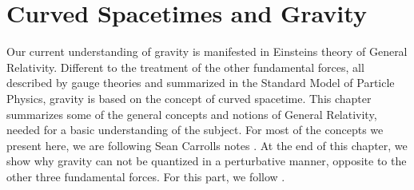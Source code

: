 \chapter{Curved Spacetimes and Gravity}\label{chap:GR}
Our current understanding of gravity is manifested in Einsteins theory of General Relativity. Different to the treatment of the other fundamental forces, all described by gauge theories and summarized in the Standard Model of Particle Physics, gravity is based on the concept of curved spacetime. This chapter summarizes some of the general concepts and notions of General Relativity, needed for a basic understanding of the subject. For most of the concepts we present here, we are following Sean Carrolls notes \cite{CarrollGR}. At the end of this chapter, we show why gravity can not be quantized in a perturbative manner, opposite to the other three fundamental forces. For this part, we follow \cite{PawlowskiNPgaugeLecture}. 

